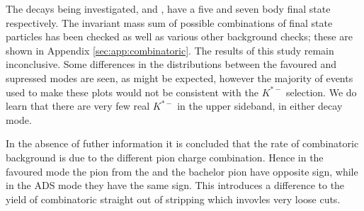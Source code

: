 The decays being investigated, \decay{\Bm}{\D(\Km\pip)\Kstarm(\KS(\pip\pim)\pim)} and \decay{\Bm}{\D(\Km\pip\pim\pip)\Kstarm(\KS(\pip\pim)\pim)}, have a five and seven body final state respectively. The invariant mass sum of possible combinations of final state particles has been checked as well as various other background checks; these are shown in Appendix \ref{sec:app:combinatoric}. The results of this study remain inconclusive. Some differences in the distributions between the favoured and supressed modes are seen, as might be expected, however the majority of events used to make these plots would not be consistent with the $K^{*-}$ selection. We do learn that there are very few real $K^{*-}$ in the upper sideband, in either decay mode.

In the absence of futher information it is concluded that the rate of combinatoric background is due to the different pion charge combination. Hence in the favoured mode the pion from the \D and the bachelor pion have opposite sign, while in the ADS mode they have the same sign. This introduces a difference to the yield of combinatoric straight out of stripping which invovles very loose cuts.



\clearpage

